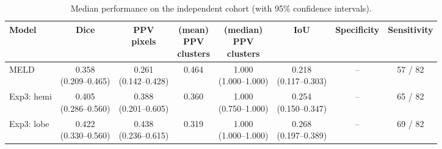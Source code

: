 \documentclass[a4paper,12pt]{article}
\begin{document}
\begin{table}[ht]
\tiny
\begin{threeparttable}
\centering
\caption{Median performance on the independent cohort (with 95\% confidence intervals).} 
\label{tab:independent_cohort}
\begin{tabular}{lccccccc}
\textbf{Model} &
\textbf{Dice} &
\makecell{\textbf{PPV}\\\textbf{pixels}} &
\makecell{\textbf{(mean)} \\\textbf{PPV}\\\textbf{clusters}} & \makecell{\textbf{(median)}\\\textbf{PPV}\\\textbf{clusters}} & 
\textbf{IoU} & 
\textbf{Specificity} &
\textbf{Sensitivity} \\
\midrule
MELD &
\makecell{0.358\\(0.209--0.465)} &
\makecell{0.261\\(0.142--0.428)} &
\colorbox{orange!20}{0.464} &
\makecell{1.000\\(1.000--1.000)} &
\makecell{0.218\\(0.117--0.303)} &
-- & %
57 / 82 \\

Exp3: hemi  &
\makecell{0.405\\(0.286--0.560)} &
\makecell{0.388\\(0.201--0.605)} &
\colorbox{blue!20}{0.360} &
\makecell{1.000\\(0.750--1.000)} &
\makecell{0.254\\(0.150--0.347)} &
-- &
65 / 82 \\

Exp3: lobe  &
\makecell{\colorbox{orange!20}{0.422}\\(0.330--0.560)} &
\makecell{0.438\\(0.236--0.615)} &
0.319 &
\makecell{1.000\\(1.000--1.000)} &
\makecell{\colorbox{orange!20}{0.268}\\(0.197--0.389)} &
-- &
\colorbox{blue!20}{69 / 82} \\



\end{tabular}
\end{threeparttable}
\end{table}
\end{document}
